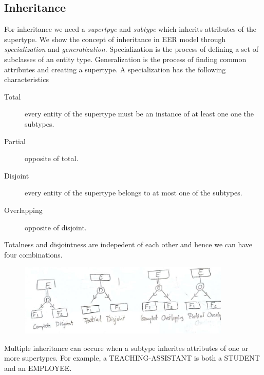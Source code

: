 \subsection{Inheritance}
For inheritance we need a \textit{supertpye} and \textit{subtype} which inherits attributes of the supertype.
We show the concept of inheritance in EER model through \textit{specialization} and \textit{generalization}. Specialization is the process of defining a set of subclasses of an entity type. Generalization is the process of finding common attributes and creating a supertype. A specialization has the following characteristics 
\begin{description}
    \item [Total] every entity of the supertype must be an instance of at least one one the subtypes.
    \item [Partial] opposite of total.
    \item [Disjoint] every entity of the supertype belongs to at most one of the subtypes.
    \item [Overlapping] opposite of disjoint.
\end{description}
Totalness and disjointness are indepedent of each other and hence we can have four combinations. 

\begin{figure}[H]
    \centering
    \includegraphics[width = 0.9\textwidth]{Graphics/inheritance.jpg}
\end{figure}
Multiple inheritance can occure when a subtype inherites attributes of one or more supertypes. For example, a TEACHING-ASSISTANT is both a STUDENT and an EMPLOYEE.

